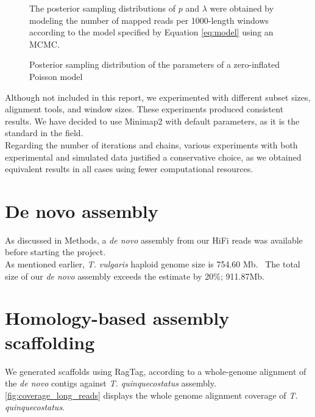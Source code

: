 \graphicspath{{gfx/}}
\begin{sidewaysfigure}
\begin{center}
    
    \caption{Posterior sampling distribution of the parameters of a zero-inflated Poisson model}    
    \label{fig:bayesian_posterior}    
\end{center}
\footnotesize
The posterior sampling distributions of $p$ and $\lambda$ were obtained by modeling the number of mapped reads per 1000-length windows according to the model specified by Equation \eqref{eq:model} using an \ac{MCMC}.   
\end{sidewaysfigure}    

Although not included in this report, we experimented with different subset sizes, alignment tools, and window sizes. These experiments produced consistent results. We have decided to use Minimap2 with default parameters, as it is the standard in the field.\\

Regarding the number of iterations and chains, various experiments with both experimental and simulated data justified a conservative choice, as we obtained equivalent results in all cases using fewer computational resources. \\

\section*{De novo assembly}

As discussed in Methods, a \textit{de novo} assembly from our \ac{HiFi} reads was available before starting the project. \\

As mentioned earlier, \textit{T. vulgaris} haploid genome size is 754.60 Mb.~\cite{marieCytometricExercisePlant1993,PlantDNACvalues} The total size of our \textit{de novo} assembly exceeds the estimate by 20\%; 911.87Mb.

\section*{Homology-based assembly scaffolding}

We generated scaffolds using RagTag, according to a whole-genome alignment of the \textit{de novo} contigs against \textit{T. quinquecostatus} assembly. \autoref{fig:coverage_long_reads} displays the whole genome alignment coverage of \textit{T. quinquecostatus}. \\

